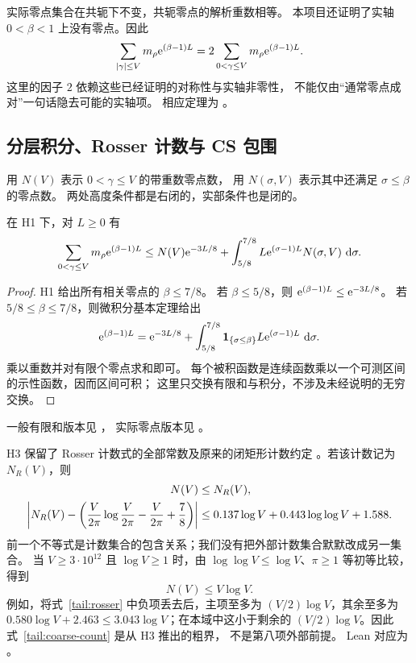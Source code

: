 实际零点集合在共轭下不变，共轭零点的解析重数相等。
本项目还证明了实轴 $0<\beta<1$ 上没有零点。因此
\begin{equation}\label{tail:pairing}
 \sum_{|\gamma|\leq V}m_\rho\mathrm e^{(\beta-1)L}
 =2\sum_{0<\gamma\leq V}m_\rho\mathrm e^{(\beta-1)L}.
\end{equation}
这里的因子 $2$ 依赖这些已经证明的对称性与实轴非零性，
不能仅由“通常零点成对”一句话隐去可能的实轴项。
相应定理为 。

\subsection{分层积分、Rosser 计数与 CS 包围}

用 $N(V)$ 表示 $0<\gamma\leq V$ 的带重数零点数，
用 $N(\sigma,V)$ 表示其中还满足 $\sigma\leq\beta$ 的零点数。
两处高度条件都是右闭的，实部条件也是闭的。

\begin{lemma}[有限零点分层]\label{tail:layer}
在 H1 下，对 $L\geq0$ 有
\begin{equation}\label{tail:layer-formula}
 \sum_{0<\gamma\leq V}m_\rho\mathrm e^{(\beta-1)L}
 \leq N(V)\mathrm e^{-3L/8}
 +\int_{5/8}^{7/8}L\mathrm e^{(\sigma-1)L}N(\sigma,V)\,\,\mathrm d\sigma.
\end{equation}
\end{lemma}

\begin{proof}
H1 给出所有相关零点的 $\beta\leq7/8$。
若 $\beta\leq5/8$，则 $\mathrm e^{(\beta-1)L}\leq\mathrm e^{-3L/8}$。
若 $5/8\leq\beta\leq7/8$，则微积分基本定理给出
\[
 \mathrm e^{(\beta-1)L}=\mathrm e^{-3L/8}
 +\int_{5/8}^{7/8}
  \mathbf{1}_{\{\sigma\leq\beta\}}L\mathrm e^{(\sigma-1)L}\,\,\mathrm d\sigma.
\]
乘以重数并对有限个零点求和即可。
每个被积函数是连续函数乘以一个可测区间的示性函数，因而区间可积；
这里只交换有限和与积分，不涉及未经说明的无穷交换。
\end{proof}

一般有限和版本见 ，
实际零点版本见 。

H3 保留了 Rosser 计数式的全部常数及原来的闭矩形计数约定
\cite{Rosser1941,Dusart2016}。若该计数记为 $N_R(V)$，则
\begin{align}
 N(V)&\leq N_R(V),\notag\\
 \left|N_R(V)-\left(\frac{V}{2\pi}\log\frac{V}{2\pi}
       -\frac{V}{2\pi}+\frac78\right)\right|
 &\leq0.137\log V+0.443\log\log V+1.588.
 \label{tail:rosser}
\end{align}
前一个不等式是计数集合的包含关系；我们没有把外部计数集合默默改成另一集合。
当 $V\geq3\cdot10^{12}$ 且 $\log V\geq1$ 时，由
$\log\log V\leq\log V$、$\pi\geq1$ 等初等比较，得到
\begin{equation}\label{tail:coarse-count}
 N(V)\leq V\log V.
\end{equation}
例如，将式~\eqref{tail:rosser} 中负项丢去后，主项至多为
$(V/2)\log V$，其余至多为
$0.580\log V+2.463\leq3.043\log V$；在本域中这小于剩余的
$(V/2)\log V$。因此式~\eqref{tail:coarse-count} 是从 H3 推出的粗界，
不是第八项外部前提。
Lean 对应为 。

